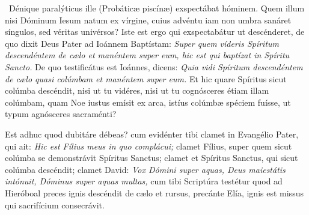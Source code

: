 {\noindent Dénique paralýticus ille (Probáticæ piscínæ) exspectábat hóminem. Quem illum nisi Dóminum Iesum natum ex vírgine, cuius advéntu iam non umbra sanáret síngulos, sed véritas univérsos? Iste est ergo qui exspectabátur ut descénderet, de quo dixit Deus Pater ad Ioánnem Baptístam: \emph{Super quem víderis Spíritum descendéntem de cælo et manéntem super eum, hic est qui baptízat in Spíritu Sancto.} De quo testificátus est Ioánnes, dicens: \emph{Quia vidi Spíritum descendéntem de cælo quasi colúmbam et manéntem super eum.} Et hic quare Spíritus sicut colúmba descéndit, nisi ut tu vidéres, nisi ut tu cognósceres étiam illam colúmbam, quam Noe iustus emísit ex arca, istíus colúmbæ spéciem fuísse, ut typum agnósceres sacraménti?

\noindent Est adhuc quod dubitáre débeas? cum evidénter tibi clamet in Evangélio Pater, qui ait: \emph{Hic est Fílius meus in quo complácui;} clamet Fílius, super quem sicut colúmba se demonstrávit Spíritus Sanctus; clamet et Spíritus Sanctus, qui sicut colúmba descéndit; clamet David: \emph{Vox Dómini super aquas, Deus maiestátis intónuit, Dóminus super aquas multas,} cum tibi Scriptúra testétur quod ad Hieróboal preces ignis descéndit de cælo et rursus, precánte Elía, ignis est missus qui sacrifícium consecrávit.

}

\newcommand{\responsoriumiii}{\pars{Responsorium 3.} \scriptura{\Rbar{} Mt. 3, 16-17 \Vbar{} ibidem; \textbf{H75}}

\vspace{-5mm}

\responsorium{II}{temporalia/resp-incolumbaespecie-CROCHU-cumdox.gtex}{}}
\newcommand{\hymnuslaudes}{\pars{Hymnus} \scriptura{Prudentius (\olddag{} 413)}

\cuminitiali{VIII}{temporalia/hym-NoxEtTenebrae-einsiedeln.gtex}}


